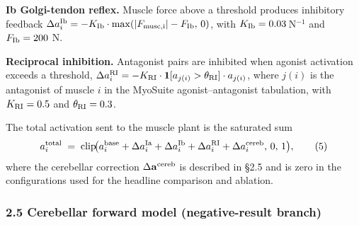 \documentclass[
  11pt,
]{article}
\begin{document}
\textbf{Ib Golgi-tendon reflex.} Muscle force above a threshold produces
inhibitory feedback
\(\Delta a^{\rm Ib}_{i} = -K_{\rm Ib}\cdot\max(|F_{\rm musc, i}|-F_{\rm Ib},\,0)\),
with \(K_{\rm Ib} = 0.03\,\)N\(^{-1}\) and \(F_{\rm Ib} = 200\) N.

\textbf{Reciprocal inhibition.} Antagonist pairs are inhibited when
agonist activation exceeds a threshold,
\(\Delta a^{\rm RI}_{i} = -K_{\rm RI}\cdot\mathbf{1}[a_{j(i)}>\theta_{\rm RI}]\cdot a_{j(i)}\),
where \(j(i)\) is the antagonist of muscle \(i\) in the MyoSuite
agonist--antagonist tabulation, with \(K_{\rm RI} = 0.5\) and
\(\theta_{\rm RI} = 0.3\).

The total activation sent to the muscle plant is the saturated sum \[
a^{\rm total}_{i} \;=\; \mathrm{clip}\!\bigl(a^{\rm base}_{i} + \Delta a^{\rm Ia}_{i} + \Delta a^{\rm Ib}_{i} + \Delta a^{\rm RI}_{i} + \Delta a^{\rm cereb}_{i},\,0,\,1\bigr), \tag{5}
\] where the cerebellar correction \(\Delta\mathbf{a}^{\rm cereb}\) is
described in §2.5 and is zero in the configurations used for the
headline comparison and ablation.

\hypertarget{cerebellar-forward-model-negative-result-branch}{%
\subsubsection{2.5 Cerebellar forward model (negative-result
branch)}\label{cerebellar-forward-model-negative-result-branch}}
\end{document}
